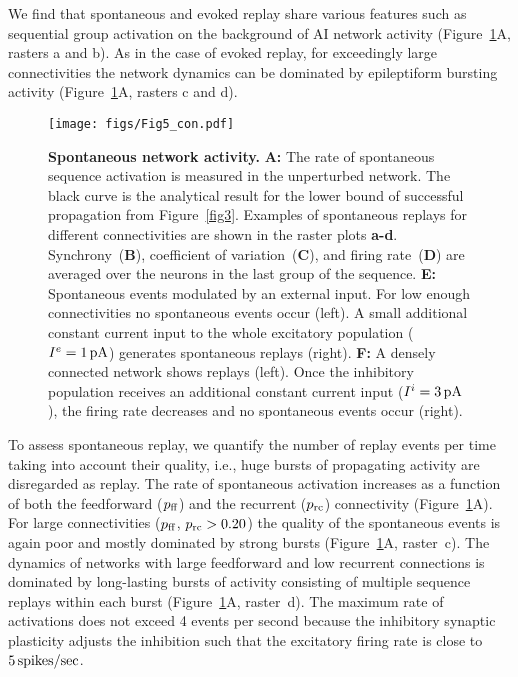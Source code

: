     We find that spontaneous and evoked replay share various features such as
    sequential group activation on the background of AI network activity
    (Figure~\ref{fig5}A, rasters a and b). As in the case of evoked replay, for
    exceedingly large connectivities the network dynamics can be dominated by
    epileptiform bursting activity (Figure~\ref{fig5}A, rasters c and d).

    \begin{figure}[!h]
      \center
      \texttt{[image: figs/Fig5\_con.pdf]}
      \caption{{\bf Spontaneous network activity.}
        \textbf{A:} The rate of spontaneous sequence activation is measured in
        the unperturbed network.  The black curve is the analytical result for
        the lower bound of successful propagation from Figure~\ref{fig3}.  Examples
        of spontaneous replays for different connectivities are shown in the
        raster plots \textbf{a-d}.
        Synchrony~(\textbf{B}), coefficient of variation~(\textbf{C}), and firing
        rate~(\textbf{D}) are averaged over the neurons in the last group of the
        sequence.
        \textbf{E:} Spontaneous events modulated by an external input.  For low
        enough connectivities no spontaneous events occur (left). A small
        additional constant current input to the whole excitatory population
        ($I^e=1\,\rm pA$) generates spontaneous replays (right).
        \textbf{F:} A densely connected network shows replays (left). Once the
        inhibitory population receives an additional constant current input
        ($I^i=3\,\rm pA$), the firing rate decreases and no spontaneous events
        occur (right).
      }
      \label{fig5}
    \end{figure}

    To assess spontaneous replay, we quantify the number of replay events per
    time taking into account their quality, i.e., huge bursts of propagating
    activity are disregarded as replay. The rate of spontaneous activation
    increases as a function of both the feedforward ($p_{\rm ff}$) and the
    recurrent ($p_{\rm rc}$) connectivity (Figure~\ref{fig5}A). For large
    connectivities ($p_{\rm ff}$, $p_{\rm rc}> 0.20$) the quality of the
    spontaneous events is again poor and mostly dominated by strong bursts
    (Figure~\ref{fig5}A, raster~c). The dynamics of networks with large
    feedforward and low recurrent connections is dominated by long-lasting
    bursts of activity consisting of multiple sequence replays within each
    burst (Figure~\ref{fig5}A, raster~d). The maximum rate of activations does not
    exceed 4 events per second because the inhibitory synaptic plasticity
    adjusts the inhibition such that the excitatory firing rate is close to $5
    \, \rm spikes/sec$.

